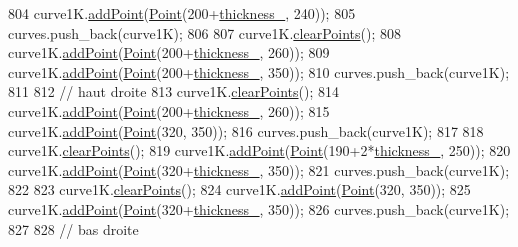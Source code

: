 \begin{DoxyCode}
804     curve1K.\mbox{\hyperlink{class_bezier_curve_a38d16c18b36ae45619b05e26e226cf34}{addPoint}}(\mbox{\hyperlink{class_point}{Point}}(200+\mbox{\hyperlink{class_font_v1_aed8040e76be9a52833627b92f0fb4e5f}{thickness\_}}, 240));
805     curves.push\_back(curve1K);
806 
807     curve1K.\mbox{\hyperlink{class_bezier_curve_a0ba8ce66d5af5971ae6a1b506029728e}{clearPoints}}();
808     curve1K.\mbox{\hyperlink{class_bezier_curve_a38d16c18b36ae45619b05e26e226cf34}{addPoint}}(\mbox{\hyperlink{class_point}{Point}}(200+\mbox{\hyperlink{class_font_v1_aed8040e76be9a52833627b92f0fb4e5f}{thickness\_}}, 260));
809     curve1K.\mbox{\hyperlink{class_bezier_curve_a38d16c18b36ae45619b05e26e226cf34}{addPoint}}(\mbox{\hyperlink{class_point}{Point}}(200+\mbox{\hyperlink{class_font_v1_aed8040e76be9a52833627b92f0fb4e5f}{thickness\_}}, 350));
810     curves.push\_back(curve1K);
811 
812     \textcolor{comment}{// haut droite}
813     curve1K.\mbox{\hyperlink{class_bezier_curve_a0ba8ce66d5af5971ae6a1b506029728e}{clearPoints}}();
814     curve1K.\mbox{\hyperlink{class_bezier_curve_a38d16c18b36ae45619b05e26e226cf34}{addPoint}}(\mbox{\hyperlink{class_point}{Point}}(200+\mbox{\hyperlink{class_font_v1_aed8040e76be9a52833627b92f0fb4e5f}{thickness\_}}, 260));
815     curve1K.\mbox{\hyperlink{class_bezier_curve_a38d16c18b36ae45619b05e26e226cf34}{addPoint}}(\mbox{\hyperlink{class_point}{Point}}(320, 350));
816     curves.push\_back(curve1K);
817 
818     curve1K.\mbox{\hyperlink{class_bezier_curve_a0ba8ce66d5af5971ae6a1b506029728e}{clearPoints}}();
819     curve1K.\mbox{\hyperlink{class_bezier_curve_a38d16c18b36ae45619b05e26e226cf34}{addPoint}}(\mbox{\hyperlink{class_point}{Point}}(190+2*\mbox{\hyperlink{class_font_v1_aed8040e76be9a52833627b92f0fb4e5f}{thickness\_}}, 250));
820     curve1K.\mbox{\hyperlink{class_bezier_curve_a38d16c18b36ae45619b05e26e226cf34}{addPoint}}(\mbox{\hyperlink{class_point}{Point}}(320+\mbox{\hyperlink{class_font_v1_aed8040e76be9a52833627b92f0fb4e5f}{thickness\_}}, 350));
821     curves.push\_back(curve1K);
822 
823     curve1K.\mbox{\hyperlink{class_bezier_curve_a0ba8ce66d5af5971ae6a1b506029728e}{clearPoints}}();
824     curve1K.\mbox{\hyperlink{class_bezier_curve_a38d16c18b36ae45619b05e26e226cf34}{addPoint}}(\mbox{\hyperlink{class_point}{Point}}(320, 350));
825     curve1K.\mbox{\hyperlink{class_bezier_curve_a38d16c18b36ae45619b05e26e226cf34}{addPoint}}(\mbox{\hyperlink{class_point}{Point}}(320+\mbox{\hyperlink{class_font_v1_aed8040e76be9a52833627b92f0fb4e5f}{thickness\_}}, 350));
826     curves.push\_back(curve1K);
827 
828     \textcolor{comment}{// bas droite}

\end{DoxyCode}
